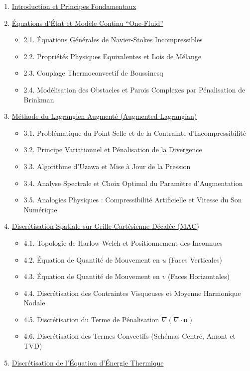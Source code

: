 \documentclass[
  french,
]{article}
\providecommand{\tightlist}{%
  \setlength{\itemsep}{0pt}\setlength{\parskip}{0pt}}
\begin{document}
\begin{enumerate}
\def\labelenumi{\arabic{enumi}.}
\tightlist
\item
  \hyperref[1-introduction-et-principes-fondamentaux]{Introduction et
  Principes Fondamentaux}
\item
  \hyperref[2-uxe9quations-duxe9tat-et-moduxe8le-continu-one-fluid]{Équations
  d'État et Modèle Continu ``One-Fluid''}

  \begin{itemize}
  \tightlist
  \item
    2.1. Équations Générales de Navier-Stokes Incompressibles
  \item
    2.2. Propriétés Physiques Equivalentes et Lois de Mélange
  \item
    2.3. Couplage Thermoconvectif de Boussinesq
  \item
    2.4. Modélisation des Obstacles et Parois Complexes par Pénalisation
    de Brinkman
  \end{itemize}
\item
  \hyperref[3-muxe9thode-du-lagrangien-augmentuxe9-augmented-lagrangian]{Méthode
  du Lagrangien Augmenté (Augmented Lagrangian)}

  \begin{itemize}
  \tightlist
  \item
    3.1. Problématique du Point-Selle et de la Contrainte
    d'Incompressibilité
  \item
    3.2. Principe Variationnel et Pénalisation de la Divergence
  \item
    3.3. Algorithme d'Uzawa et Mise à Jour de la Pression
  \item
    3.4. Analyse Spectrale et Choix Optimal du Paramètre d'Augmentation
  \item
    3.5. Analogies Physiques : Compressibilité Artificielle et Vitesse
    du Son Numérique
  \end{itemize}
\item
  \hyperref[4-discruxe9tisation-spatiale-sur-grille-cartuxe9sienne-duxe9caluxe9e-mac]{Discrétisation
  Spatiale sur Grille Cartésienne Décalée (MAC)}

  \begin{itemize}
  \tightlist
  \item
    4.1. Topologie de Harlow-Welch et Positionnement des Inconnues
  \item
    4.2. Équation de Quantité de Mouvement en \(u\) (Faces Verticales)
  \item
    4.3. Équation de Quantité de Mouvement en \(v\) (Faces Horizontales)
  \item
    4.4. Discrétisation des Contraintes Visqueuses et Moyenne Harmonique
    Nodale
  \item
    4.5. Discrétisation du Terme de Pénalisation
    \(\nabla (\nabla \cdot \mathbf{u})\)
  \item
    4.6. Discrétisation des Termes Convectifs (Schémas Centré, Amont et
    TVD)
  \end{itemize}
\item
  \hyperref[5-discruxe9tisation-de-luxe9quation-duxe9nergie-thermique]{Discrétisation
  de l'Équation d'Énergie Thermique}


\end{enumerate}
\end{document}
